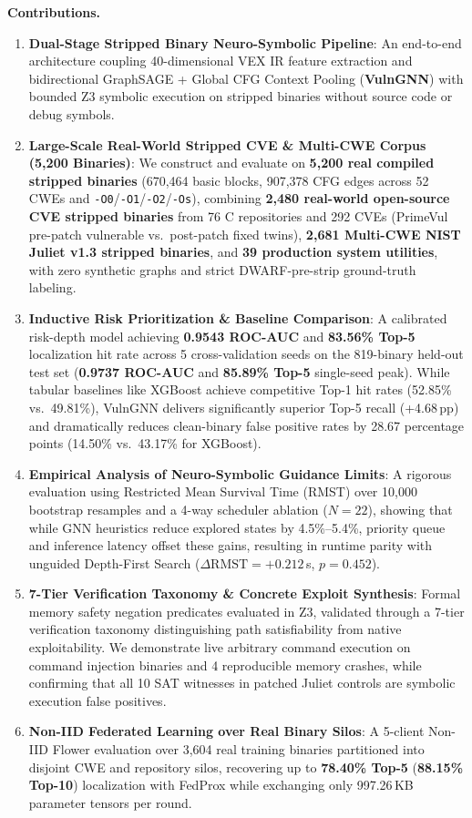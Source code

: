 \documentclass[10pt,conference]{IEEEtran}
\begin{document}
\textbf{Contributions.}
\begin{enumerate}
  \item \textbf{Dual-Stage Stripped Binary Neuro-Symbolic Pipeline}: An end-to-end architecture coupling 40-dimensional VEX IR feature extraction and bidirectional GraphSAGE + Global CFG Context Pooling (\textbf{VulnGNN}) with bounded Z3 symbolic execution on stripped binaries without source code or debug symbols.
  \item \textbf{Large-Scale Real-World Stripped CVE \& Multi-CWE Corpus (5{,}200 Binaries)}: We construct and evaluate on \textbf{5{,}200 real compiled stripped binaries} (670{,}464 basic blocks, 907{,}378 CFG edges across 52 CWEs and \texttt{-O0}/\texttt{-O1}/\texttt{-O2}/\texttt{-Os}), combining \textbf{2{,}480 real-world open-source CVE stripped binaries} from 76 C repositories and 292 CVEs (PrimeVul~\cite{ding2024primevul} pre-patch vulnerable vs.\ post-patch fixed twins), \textbf{2{,}681 Multi-CWE NIST Juliet v1.3 stripped binaries}, and \textbf{39 production system utilities}, with zero synthetic graphs and strict DWARF-pre-strip ground-truth labeling.
  \item \textbf{Inductive Risk Prioritization \& Baseline Comparison}: A calibrated risk-depth model achieving \textbf{0.9543 ROC-AUC} and \textbf{83.56\% Top-5} localization hit rate across 5 cross-validation seeds on the 819-binary held-out test set (\textbf{0.9737 ROC-AUC} and \textbf{85.89\% Top-5} single-seed peak). While tabular baselines like XGBoost achieve competitive Top-1 hit rates (52.85\% vs.\ 49.81\%), VulnGNN delivers significantly superior Top-5 recall (+4.68\,pp) and dramatically reduces clean-binary false positive rates by 28.67 percentage points (14.50\% vs.\ 43.17\% for XGBoost).
  \item \textbf{Empirical Analysis of Neuro-Symbolic Guidance Limits}: A rigorous evaluation using Restricted Mean Survival Time (RMST) over 10{,}000 bootstrap resamples and a 4-way scheduler ablation ($N=22$), showing that while GNN heuristics reduce explored states by 4.5\%--5.4\%, priority queue and inference latency offset these gains, resulting in runtime parity with unguided Depth-First Search ($\Delta\text{RMST} = +0.212$\,s, $p = 0.452$).
  \item \textbf{7-Tier Verification Taxonomy \& Concrete Exploit Synthesis}: Formal memory safety negation predicates evaluated in Z3, validated through a 7-tier verification taxonomy distinguishing path satisfiability from native exploitability. We demonstrate live arbitrary command execution on command injection binaries and 4 reproducible memory crashes, while confirming that all 10 SAT witnesses in patched Juliet controls are symbolic execution false positives.
  \item \textbf{Non-IID Federated Learning over Real Binary Silos}: A 5-client Non-IID Flower evaluation over 3{,}604 real training binaries partitioned into disjoint CWE and repository silos, recovering up to \textbf{78.40\% Top-5} (\textbf{88.15\% Top-10}) localization with FedProx while exchanging only 997.26\,KB parameter tensors per round.
\end{enumerate}
\end{document}
